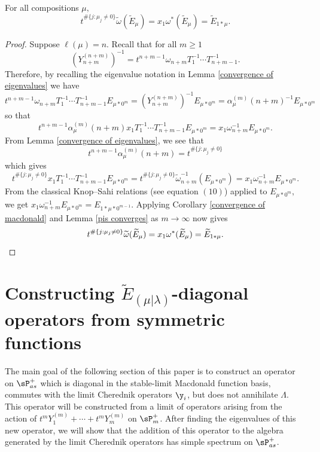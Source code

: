 \begin{prop}
    For all compositions $\mu,$ 
    \begin{equation}
        t^{\#\{j:\mu_j \neq 0\}}\widetilde{\omega}( \widetilde{E}_{\mu}) = x_1 \omega^{*}(\widetilde{E}_{\mu}) = \widetilde{E}_{1*\mu}.
    \end{equation}
\end{prop}
\begin{proof}
    Suppose $\ell(\mu) = n$. Recall that for all $m \geq 1$
    $$(Y^{(n+m)}_{n+m})^{-1} = t^{n+m-1} \omega_{n+m}T_1^{-1}\cdots T_{n+m-1}^{-1}.$$ Therefore, by recalling the eigenvalue notation in Lemma \ref{convergence of eigenvalues} we have 
    $$t^{n+m-1} \omega_{n+m}T_1^{-1}\cdots T_{n+m-1}^{-1}E_{\mu*0^m} = (Y^{(n+m)}_{n+m})^{-1} E_{\mu*0^m} = \alpha_{\mu}^{(m)}(n+m)^{-1}E_{\mu*0^m}$$
    so that 
    $$t^{n+m-1}\alpha_{\mu}^{(m)}(n+m) x_1 T_1^{-1}\cdots T_{n+m-1}^{-1}E_{\mu*0^m} = x_1 \omega_{n+m}^{-1}E_{\mu*0^m}.$$
    From Lemma \ref{convergence of eigenvalues}, we see that 
    $$t^{n+m-1}\alpha_{\mu}^{(m)}(n+m) = t^{\#\{j:\mu_j \neq 0\}}$$
    which gives 
    $$t^{\#\{j:\mu_j \neq 0\}} x_1 T_1^{-1}\cdots T_{n+m-1}^{-1}E_{\mu*0^m} = t^{\#\{j:\mu_j \neq 0\}} \widetilde{\omega}_{n+m}^{-1}(E_{\mu*0^m}) = x_1 \omega_{n+m}^{-1}E_{\mu*0^m}. $$
    From the classical Knop--Sahi relations (see \cite{haglund2007combinatorial} equation $(10)$) applied to $E_{\mu*0^m},$ we get 
    $x_1 \omega_{n+m}^{-1}E_{\mu*0^m} = E_{1*\mu*0^{m-1}}.$
    Applying Corollary \ref{convergence of macdonald} and Lemma \ref{pis converges} as $m \rightarrow \infty$ now gives 
    \[t^{\#\{j:\mu_j \neq 0\}}\widetilde{\omega}(\widetilde{E}_{\mu}) = x_1 \omega^{*}(\widetilde{E}_{\mu}) = \widetilde{E}_{1*\mu}. \qedhere\]
\end{proof}


\section{Constructing \texorpdfstring{$\widetilde{E}_{(\mu|\lambda)}$}{E\_(mu | lambda)}-diagonal operators from symmetric functions}\label{one dim wt spaces section}

The main goal of the following section of this paper is to construct an operator on $\sP_{as}^{+}$ which is diagonal in the stable-limit Macdonald function basis, commutes with the limit Cherednik operators $\y_i$, but does not annihilate $\Lambda$. This operator will be constructed from a limit of operators arising from the action of $t^mY^{(m)}_1+ \cdots +t^m Y^{(m)}_m$ on $\sP_m^{+}$. After finding the eigenvalues of this new operator, we will show that the addition of this operator to the algebra generated by the limit Cherednik operators has simple spectrum on $\sP_{as}^{+}$.

